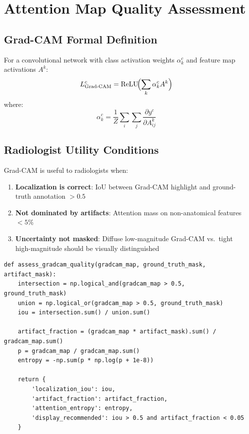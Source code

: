 \section{Attention Map Quality Assessment}

\subsection{Grad-CAM Formal Definition}

For a convolutional network with class activation weights $\alpha_k^c$ and feature map activations $A^k$:
\[
L_{\text{Grad-CAM}}^c = \text{ReLU}\!\Bigl(\sum_k \alpha_k^c A^k\Bigr)
\]
where:
\[
\alpha_k^c = \frac{1}{Z} \sum_i \sum_j \frac{\partial y^c}{\partial A_{ij}^k}
\]

\subsection{Radiologist Utility Conditions}

Grad-CAM is useful to radiologists when:
\begin{enumerate}
    \item \textbf{Localization is correct}: IoU between Grad-CAM highlight and ground-truth annotation $> 0.5$
    \item \textbf{Not dominated by artifacts}: Attention mass on non-anatomical features $< 5\%$
    \item \textbf{Uncertainty not masked}: Diffuse low-magnitude Grad-CAM vs.\ tight high-magnitude should be visually distinguished
\end{enumerate}

\begin{lstlisting}[style=python, caption={Grad-CAM quality assessment}]
def assess_gradcam_quality(gradcam_map, ground_truth_mask, artifact_mask):
    intersection = np.logical_and(gradcam_map > 0.5, ground_truth_mask)
    union = np.logical_or(gradcam_map > 0.5, ground_truth_mask)
    iou = intersection.sum() / union.sum()

    artifact_fraction = (gradcam_map * artifact_mask).sum() / gradcam_map.sum()
    p = gradcam_map / gradcam_map.sum()
    entropy = -np.sum(p * np.log(p + 1e-8))

    return {
        'localization_iou': iou,
        'artifact_fraction': artifact_fraction,
        'attention_entropy': entropy,
        'display_recommended': iou > 0.5 and artifact_fraction < 0.05
    }
\end{lstlisting}

